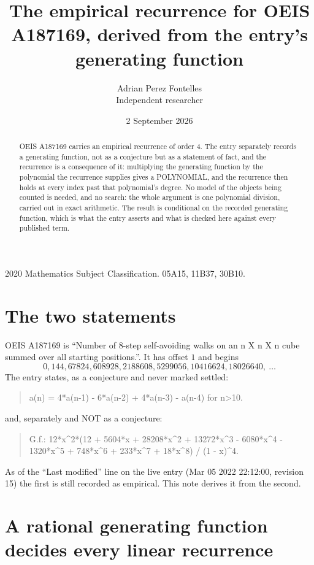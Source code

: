 \documentclass[11pt,a4paper]{article}
\title{The empirical recurrence for OEIS A187169, derived from the entry's generating function}
\author{Adrian Perez Fontelles\\ \small Independent researcher}
\date{2 September 2026}
\theoremstyle{plain}
\theoremstyle{definition}
\begin{document}
\maketitle

\begin{abstract}
OEIS A187169 carries an empirical recurrence of order $4$. The entry separately records a
generating function, not as a conjecture but as a statement of fact, and the recurrence is a
consequence of it: multiplying the generating function by the polynomial the recurrence
supplies gives a POLYNOMIAL, and the recurrence then holds at every index past that
polynomial's degree. No model of the objects being counted is needed, and no search: the
whole argument is one polynomial division, carried out in exact arithmetic. The result is
conditional on the recorded generating function, which is what the entry asserts and what is
checked here against every published term.
\end{abstract}

\noindent\small 2020 Mathematics Subject Classification. 05A15, 11B37, 30B10.\normalsize

\section{The two statements}

OEIS A187169 is ``Number of 8-step self-avoiding walks on an n X n X n cube summed over all starting positions.''. It has offset $1$ and begins
\[
0, 144, 67824, 608928, 2188608, 5299056, 10416624, 18026640,\ \dots
\]
The entry states, as a conjecture and never marked settled:
\begin{quote}
a(n) = 4*a(n-1) - 6*a(n-2) + 4*a(n-3) - a(n-4) for n>10.
\end{quote}
and, separately and NOT as a conjecture:
\begin{quote}
G.f.: 12*x\^{}2*(12 + 5604*x + 28208*x\^{}2 + 13272*x\^{}3 - 6080*x\^{}4 - 1320*x\^{}5 + 748*x\^{}6 + 233*x\^{}7 + 18*x\^{}8) / (1 - x)\^{}4.
\end{quote}
As of the ``Last modified'' line on the live entry (Mar 05 2022 22:12:00, revision 15) the first is still
recorded as empirical. This note derives it from the second.

\section{A rational generating function decides every linear recurrence}
\end{document}

